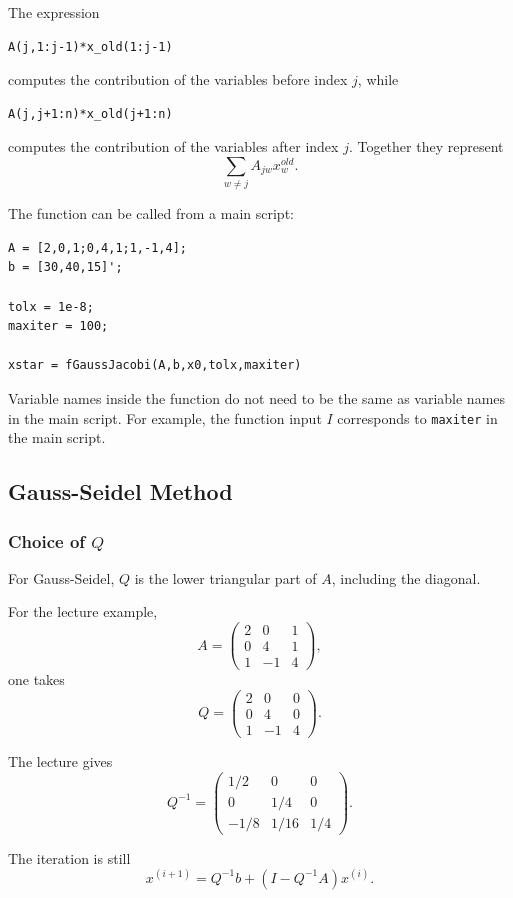 \documentclass[10pt, letterpaper]{article}
\begin{document}
The expression
\begin{verbatim}
A(j,1:j-1)*x_old(1:j-1)
\end{verbatim}
computes the contribution of the variables before index \(j\), while
\begin{verbatim}
A(j,j+1:n)*x_old(j+1:n)
\end{verbatim}
computes the contribution of the variables after index \(j\). Together they represent
\[
\sum_{w\neq j}A_{jw}x_w^{old}.
\]

The function can be called from a main script:
\begin{verbatim}
A = [2,0,1;0,4,1;1,-1,4];
b = [30,40,15]';

tolx = 1e-8;
maxiter = 100;

xstar = fGaussJacobi(A,b,x0,tolx,maxiter)
\end{verbatim}

Variable names inside the function do not need to be the same as variable names in the main script. For example, the function input \(I\) corresponds to \verb|maxiter| in the main script.

\subsection{Gauss-Seidel Method}

\subsubsection{Choice of \(Q\)}

For Gauss-Seidel, \(Q\) is the lower triangular part of \(A\), including the diagonal.

For the lecture example,
\[
A=
\begin{pmatrix}
2&0&1\\
0&4&1\\
1&-1&4
\end{pmatrix},
\]
one takes
\[
Q=
\begin{pmatrix}
2&0&0\\
0&4&0\\
1&-1&4
\end{pmatrix}.
\]

The lecture gives
\[
Q^{-1}
=
\begin{pmatrix}
1/2&0&0\\
0&1/4&0\\
-1/8&1/16&1/4
\end{pmatrix}.
\]

The iteration is still
\[
x^{(i+1)}
=
Q^{-1}b+(I-Q^{-1}A)x^{(i)}.
\]
\end{document}
